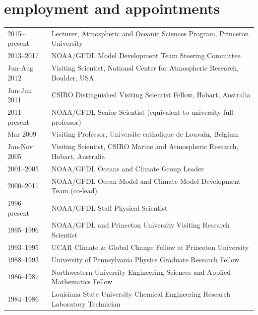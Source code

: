 \documentclass{article}
\begin{document}
\section*{\sc \color{Maroon}   employment and appointments} 
\vspace{-.25cm}
\begin{tabular}{ll}


2015--present & Lecturer, Atmospheric and Oceanic Sciences Program, Princeton University
  \\
  2013--2017  & NOAA/GFDL Model Development Team Steering Committee  \\
  Jun-Aug 2012  & Visiting Scientist, National Center for Atmospheric
                  Research, Boulder, USA \\
  Jan-Jun 2011   & CSIRO Distinguished Visiting Scientist Fellow, Hobart, Australia \\
  2011-present & NOAA/GFDL Senior Scientist (equivalent to university full professor) \\ 
  Mar 2009         & Visiting Professor, Universite catholique de Louvain, Belgium \\
  Jan-Nov 2005   & Visiting Scientist, CSIRO Marine and Atmospheric  Research, Hobart, Australia \\
  2001--2005     & NOAA/GFDL Oceans and Climate Group Leader \\
  2000--2011     & NOAA/GFDL Ocean Model and Climate Model Development Team (co-lead) \\
  1996-present   &  NOAA/GFDL Staff Physical Scientist \\  
  1995--1996     &  NOAA/GFDL and Princeton University Visiting Research Scientist  \\ 
  1993--1995     & UCAR Climate \& Global Change Fellow at Princeton University \\
  1988--1993     &  University of Pennsylvania Physics Graduate Research Fellow  \\                     
  1986--1987     &  Northwestern University Engineering Sciences and Applied Mathematics Fellow \\
  1984--1986     &  Louisiana State University Chemical Engineering Research Laboratory Technician                     
\end{tabular}
\end{document}
